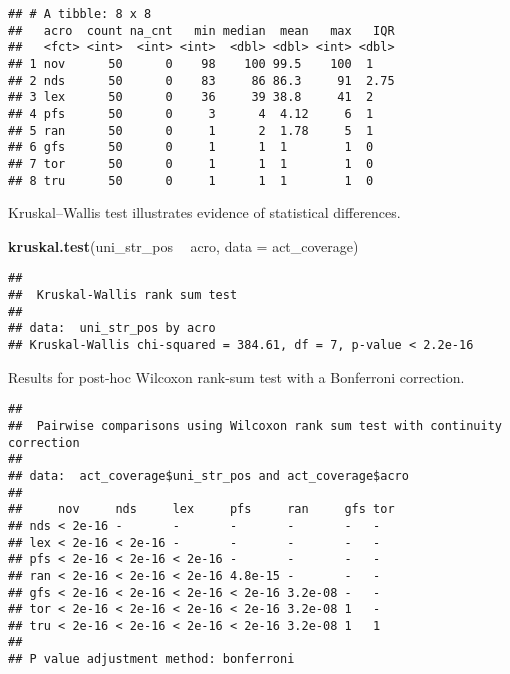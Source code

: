 \documentclass[]{book}
\newenvironment{Shaded}{\begin{snugshade}}{\end{snugshade}}
\newcommand{\DataTypeTok}[1]{\textcolor[rgb]{0.13,0.29,0.53}{#1}}
\newcommand{\KeywordTok}[1]{\textcolor[rgb]{0.13,0.29,0.53}{\textbf{#1}}}
\newcommand{\NormalTok}[1]{#1}
\newcommand{\OperatorTok}[1]{\textcolor[rgb]{0.81,0.36,0.00}{\textbf{#1}}}
\newcommand{\OtherTok}[1]{\textcolor[rgb]{0.56,0.35,0.01}{#1}}
\newcommand{\StringTok}[1]{\textcolor[rgb]{0.31,0.60,0.02}{#1}}
\begin{document}
\begin{verbatim}
## # A tibble: 8 x 8
##   acro  count na_cnt   min median  mean   max   IQR
##   <fct> <int>  <int> <int>  <dbl> <dbl> <int> <dbl>
## 1 nov      50      0    98    100 99.5    100  1   
## 2 nds      50      0    83     86 86.3     91  2.75
## 3 lex      50      0    36     39 38.8     41  2   
## 4 pfs      50      0     3      4  4.12     6  1   
## 5 ran      50      0     1      2  1.78     5  1   
## 6 gfs      50      0     1      1  1        1  0   
## 7 tor      50      0     1      1  1        1  0   
## 8 tru      50      0     1      1  1        1  0
\end{verbatim}

Kruskal--Wallis test illustrates evidence of statistical differences.

\begin{Shaded}
\begin{Highlighting}[]
\KeywordTok{kruskal.test}\NormalTok{(uni_str_pos }\OperatorTok{~}\StringTok{ }\NormalTok{acro, }\DataTypeTok{data =}\NormalTok{ act_coverage)}
\end{Highlighting}
\end{Shaded}

\begin{verbatim}
## 
##  Kruskal-Wallis rank sum test
## 
## data:  uni_str_pos by acro
## Kruskal-Wallis chi-squared = 384.61, df = 7, p-value < 2.2e-16
\end{verbatim}

Results for post-hoc Wilcoxon rank-sum test with a Bonferroni correction.

\begin{Shaded}
\end{Shaded}

\begin{verbatim}
## 
##  Pairwise comparisons using Wilcoxon rank sum test with continuity correction 
## 
## data:  act_coverage$uni_str_pos and act_coverage$acro 
## 
##     nov     nds     lex     pfs     ran     gfs tor
## nds < 2e-16 -       -       -       -       -   -  
## lex < 2e-16 < 2e-16 -       -       -       -   -  
## pfs < 2e-16 < 2e-16 < 2e-16 -       -       -   -  
## ran < 2e-16 < 2e-16 < 2e-16 4.8e-15 -       -   -  
## gfs < 2e-16 < 2e-16 < 2e-16 < 2e-16 3.2e-08 -   -  
## tor < 2e-16 < 2e-16 < 2e-16 < 2e-16 3.2e-08 1   -  
## tru < 2e-16 < 2e-16 < 2e-16 < 2e-16 3.2e-08 1   1  
## 
## P value adjustment method: bonferroni
\end{verbatim}
\end{document}

